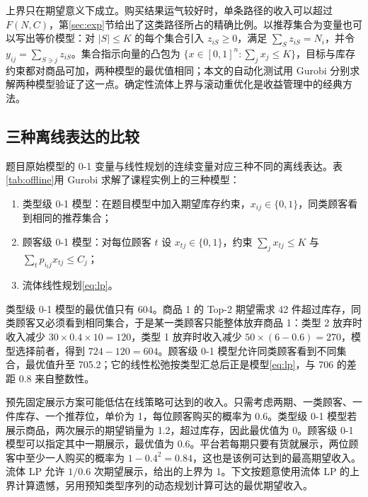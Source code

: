 上界只在期望意义下成立。购买结果运气较好时，单条路径的收入可以超过 $F(N,C)$，第\ref{sec:exp}节给出了这类路径所占的精确比例。以推荐集合为变量也可以写出等价模型：对 $|S|\le K$ 的每个集合引入 $z_{iS}\ge0$，满足 $\sum_Sz_{iS}=N_i$，并令 $y_{ij}=\sum_{S\ni j}z_{iS}$。集合指示向量的凸包为 $\{x\in[0,1]^n:\sum_jx_j\le K\}$，目标与库存约束都对商品可加，两种模型的最优值相同；本文的自动化测试用 Gurobi 分别求解两种模型验证了这一点。确定性流体上界与滚动重优化是收益管理中的经典方法\cite{gallego,talluri98,jasin}。

\subsection{三种离线表达的比较}
题目原始模型的 0-1 变量与线性规划的连续变量对应三种不同的离线表达。表\ref{tab:offline}用 Gurobi 求解了课程实例上的三种模型：
\begin{enumerate}[label=(\alph*)]
\item 类型级 0-1 模型：在题目模型中加入期望库存约束，$x_{ij}\in\{0,1\}$，同类顾客看到相同的推荐集合；
\item 顾客级 0-1 模型：对每位顾客 $t$ 设 $x_{tj}\in\{0,1\}$，约束 $\sum_jx_{tj}\le K$ 与 $\sum_tp_{i_tj}x_{tj}\le C_j$；
\item 流体线性规划\eqref{eq:lp}。
\end{enumerate}



类型级 0-1 模型的最优值只有 604。商品 1 的 Top-2 期望需求 42 件超过库存，同类顾客又必须看到相同集合，于是某一类顾客只能整体放弃商品 1：类型 2 放弃时收入减少 $30\times0.4\times10=120$，类型 1 放弃时收入减少 $50\times(6-0.6)=270$，模型选择前者，得到 $724-120=604$。顾客级 0-1 模型允许同类顾客看到不同集合，最优值升至 705.2；它的线性松弛按类型汇总后正是模型\eqref{eq:lp}，与 706 的差距 0.8 来自整数性。

预先固定展示方案可能低估在线策略可达到的收入。只需考虑两期、一类顾客、一件库存、一个推荐位，单价为 1，每位顾客购买的概率为 0.6。类型级 0-1 模型若展示商品，两次展示的期望销量为 1.2，超过库存，因此最优值为 0。顾客级 0-1 模型可以指定其中一期展示，最优值为 0.6。平台若每期只要有货就展示，两位顾客中至少一人购买的概率为 $1-0.4^2=0.84$，这也是该例可达到的最高期望收入。流体 LP 允许 $1/0.6$ 次期望展示，给出的上界为 1。下文按题意使用流体 LP 的上界计算遗憾，另用预知类型序列的动态规划计算可达的最优期望收入。

